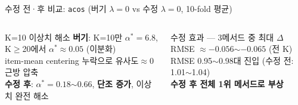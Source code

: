 \documentclass[aspectratio=169,10pt]{beamer}
\begin{document}
\begin{frame}[shrink=20]{수정 전·후 비교: \texttt{acos} \textnormal{\small(버기 $\lambda=0$ vs 수정 $\lambda=0$, 10-fold 평균)}}
\begin{columns}[T]
			\begin{alertblock}{K=10 이상치 해소}
				\small
				\textbf{버기}: K=10만 $\alpha^*=6.8$, K$\geq$20에서 $\alpha^*\approx0.05$ (이분화)\\
				item-mean centering 누락으로 유사도$\approx 0$ 근방 압축\\
				\vspace{0.3em}
				\textbf{수정 후}: $\alpha^*=0.18$$\sim$$0.66$, \textbf{단조 증가}, 이상치 완전 해소
			\end{alertblock}
			\begin{exampleblock}{수정 효과 — 3메서드 중 최대}
				\small
				$\Delta$RMSE $\approx -0.056$$\sim$$-0.065$ (전 K)\\
				RMSE 0.95$\sim$0.98대 진입 (수정 전: 1.01$\sim$1.04)\\
				\textbf{수정 후 전체 1위 메서드로 부상}
			\end{exampleblock}
	\end{columns}
\end{frame}
\end{document}
